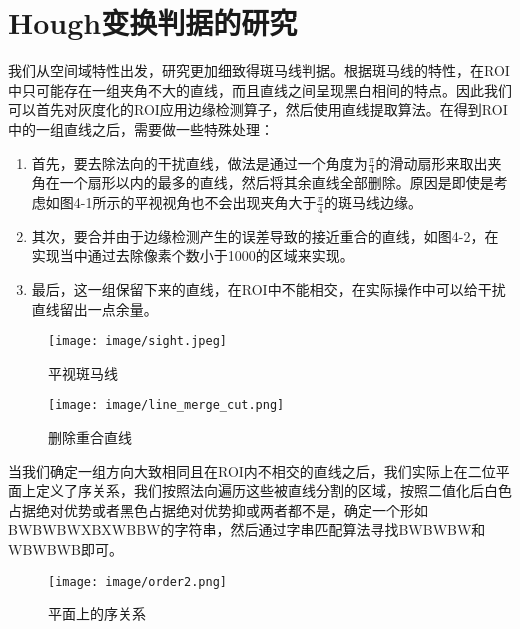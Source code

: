 \section{Hough变换判据的研究}
我们从空间域特性出发，研究更加细致得斑马线判据。根据斑马线的特性，在ROI中只可能存在一组夹角不大的直线，而且直线之间呈现黑白相间的特点。因此我们可以首先对灰度化的ROI应用边缘检测算子，然后使用直线提取算法。在得到ROI中的一组直线之后，需要做一些特殊处理：
\begin{enumerate}
    \item 首先，要去除法向的干扰直线，做法是通过一个角度为$\frac{\pi}{4}$的滑动扇形来取出夹角在一个扇形以内的最多的直线，然后将其余直线全部删除。原因是即使是考虑如图4-1所示的平视视角也不会出现夹角大于$\frac{\pi}{4}$的斑马线边缘。
    \item 其次，要合并由于边缘检测产生的误差导致的接近重合的直线，如图4-2，在实现当中通过去除像素个数小于1000的区域来实现。
    \item 最后，这一组保留下来的直线，在ROI中不能相交，在实际操作中可以给干扰直线留出一点余量。
\end{enumerate}
\begin{figure}[h]
	\centering
	\texttt{[image: image/sight.jpeg]}
	\caption{平视斑马线}
\end{figure}
\begin{figure}[h]
	\centering
	\texttt{[image: image/line\_merge\_cut.png]}
    \caption{删除重合直线}
\end{figure}
\par
当我们确定一组方向大致相同且在ROI内不相交的直线之后，我们实际上在二位平面上定义了序关系，我们按照法向遍历这些被直线分割的区域，按照二值化后白色占据绝对优势或者黑色占据绝对优势抑或两者都不是，确定一个形如BWBWBWXBXWBBW的字符串，然后通过字串匹配算法寻找BWBWBW和WBWBWB即可。
\begin{figure}[h]
	\centering
	\texttt{[image: image/order2.png]}
	\caption{平面上的序关系}
\end{figure}

